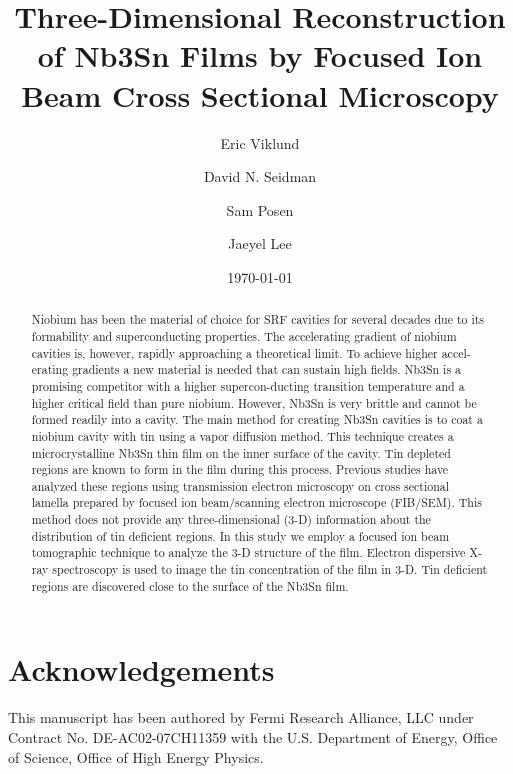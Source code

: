 \documentclass{revtex4-2}
\begin{document}
\title{Three-Dimensional Reconstruction of Nb3Sn Films by Focused Ion Beam Cross Sectional Microscopy}
\author{Eric Viklund}
\author{David N. Seidman}
\author{Sam Posen}
\author{Jaeyel Lee}


\date{\today}

\begin{abstract}

    Niobium has been the material of choice for SRF cavities for several decades due to its formability and superconducting properties. The accelerating gradient of niobium cavities is, however, rapidly approaching a theoretical limit. To achieve higher accel-erating gradients a new material is needed that can sustain high fields. Nb3Sn is a promising competitor with a higher supercon-ducting transition temperature and a higher critical field than pure niobium. However, Nb3Sn is very brittle and cannot be formed readily into a cavity. The main method for creating Nb3Sn cavities is to coat a niobium cavity with tin using a vapor diffusion method. This technique creates a microcrystalline Nb3Sn thin film on the inner surface of the cavity. Tin depleted regions are known to form in the film during this process. Previous studies have analyzed these regions using transmission electron microscopy on cross sectional lamella prepared by focused ion beam/scanning electron microscope (FIB/SEM). This method does not provide any three-dimensional (3-D) information about the distribution of tin deficient regions. In this study we employ a focused ion beam tomographic technique to analyze the 3-D structure of the film. Electron dispersive X-ray spectroscopy is used to image the tin concentration of the film in 3-D. Tin deficient regions are discovered close to the surface of the Nb3Sn film.

\end{abstract}

\maketitle



\section{Acknowledgements}

This manuscript has been authored by Fermi Research Alliance, LLC under Contract No. DE-AC02-07CH11359 with the U.S. Department of Energy, Office of Science, Office of High Energy Physics.



\end{document}
